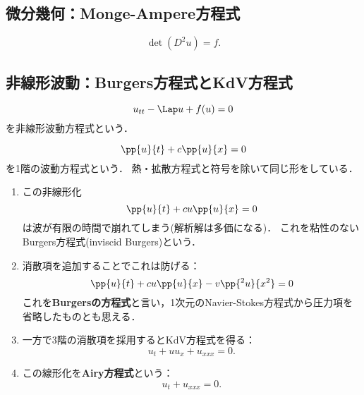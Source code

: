 \documentclass[uplatex,dvipdfmx]{jsreport}
\begin{document}
\subsection{微分幾何：Monge-Ampere方程式}

\begin{model}
    \[\det(D^2u)=f.\]
\end{model}

\subsection{非線形波動：Burgers方程式とKdV方程式}

\begin{tcolorbox}[colframe=ForestGreen, colback=ForestGreen!10!white,breakable,colbacktitle=ForestGreen!40!white,coltitle=black,fonttitle=\bfseries\sffamily,
title=]
    
\end{tcolorbox}

\begin{model}
    \[u_{tt}-\Lap u+f(u)=0\]
    を非線形波動方程式という．
\end{model}

\begin{model}
    \[\pp{u}{t}+c\pp{u}{x}=0\]
    を1階の波動方程式という．
    熱・拡散方程式と符号を除いて同じ形をしている．
    \begin{enumerate}
        \item この非線形化
        \[\pp{u}{t}+cu\pp{u}{x}=0\]
        は波が有限の時間で崩れてしまう(解析解は多価になる)．
        これを粘性のないBurgers方程式(inviscid Burgers)という．
        \item 消散項を追加することでこれは防げる：
        \[\pp{u}{t}+cu\pp{u}{x}-v\pp{^2u}{x^2}=0\]
        これを\textbf{Burgersの方程式}と言い，1次元のNavier-Stokes方程式から圧力項を省略したものとも思える．
        \item 一方で3階の消散項を採用するとKdV方程式を得る：
        \[u_t+uu_x+u_{xxx}=0.\]
        \item この線形化を\textbf{Airy方程式}という：
        \[u_t+u_{xxx}=0.\]
    \end{enumerate}
\end{model}
\end{document}
